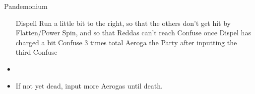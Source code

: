 \begin{battle}{Pandemonium}
	\begin{itemize}
		      \penelof Dispell
		      \vaanf Run a little bit to the right, so that the others don't get hit by Flatten/Power Spin, and so that Reddas can't reach 
		      \vaanf Confuse once Dispel has charged a bit
		      \vaanf Confuse 3 times total
		      \penelof Aeroga the Party after inputting the third Confuse
		      \item \GirlsGambitOff
		      \item If not yet dead, input more Aerogas until death.
	\end{itemize}
\end{battle}